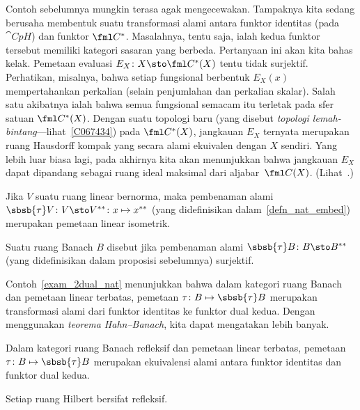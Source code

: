 Contoh sebelumnya mungkin terasa agak mengecewakan.  Tampaknya kita sedang
berusaha membentuk suatu transformasi alami antara funktor identitas (pada
$\cat{CpH}$) dan funktor $\fml C^*$.  Masalahnya, tentu saja, ialah kedua
funktor tersebut memiliki kategori sasaran yang berbeda.  Pertanyaan ini akan kita bahas kelak.
Pemetaan evaluasi $E_X\colon X \sto \fml C^*(X)$ tentu tidak surjektif.
Perhatikan, misalnya, bahwa setiap fungsional berbentuk $E_X(x)$
mempertahankan perkalian (selain penjumlahan dan perkalian skalar). Salah satu akibatnya
ialah bahwa semua fungsional semacam itu terletak pada sfer satuan $\fml C^*(X)$.
Dengan suatu topologi baru (yang disebut \emph{topologi lemah-bintang}---lihat~\ref{C067434}) pada
$\fml C^*(X)$, jangkauan $E_X$ ternyata merupakan ruang Hausdorff kompak yang secara alami
ekuivalen dengan $X$ sendiri.  Yang lebih luar biasa lagi, pada akhirnya kita akan menunjukkan bahwa jangkauan $E_X$
dapat dipandang sebagai ruang ideal maksimal dari aljabar~$\fml C(X)$. (Lihat~.)

\begin{prop}\label{C067137} Jika $V$ suatu ruang linear bernorma, maka pembenaman alami
$\sbsb{\tau}V \colon V \sto V^{**}\colon x \mapsto x^{**}$ (yang didefinisikan dalam~\ref{defn_nat_embed})
merupakan pemetaan linear isometrik.
\end{prop}

\begin{defn} Suatu ruang Banach $B$ disebut
 jika pembenaman alami $\sbsb{\tau}B\colon B \sto B^{**}$ (yang didefinisikan dalam proposisi sebelumnya) surjektif.
\end{defn}

Contoh~\ref{exam_2dual_nat} menunjukkan bahwa dalam kategori ruang Banach dan pemetaan linear terbatas,
pemetaan $\tau\colon B \mapsto \sbsb{\tau}B$ merupakan transformasi alami dari
funktor identitas ke funktor dual kedua.  Dengan menggunakan \emph{teorema Hahn--Banach}, kita dapat
mengatakan lebih banyak.

\begin{prop} Dalam kategori ruang Banach refleksif dan pemetaan linear terbatas, pemetaan
$\tau\colon B \mapsto \sbsb{\tau}B$ merupakan ekuivalensi alami antara funktor identitas dan
funktor dual kedua.
\end{prop}

\begin{exam} Setiap ruang Hilbert bersifat refleksif.
\end{exam}


